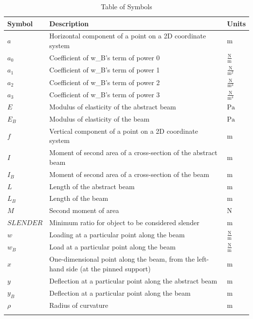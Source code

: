 \documentclass[12pt]{article}
\begin{document}
\begin{longtabu}{l X[l] l}
\toprule
\textbf{Symbol} & \textbf{Description} & \textbf{Units}
\\
\midrule
\endhead
$a$ & Horizontal component of a point on a 2D coordinate system & ${\text{m}}$
\\
${a_{\text{0}}}$ & Coefficient of w\_B's term of power 0 & $\frac{\text{N}}{\text{m}}$
\\
${a_{\text{1}}}$ & Coefficient of w\_B's term of power 1 & $\frac{\text{N}}{\text{m}^{2}}$
\\
${a_{\text{2}}}$ & Coefficient of w\_B's term of power 2 & $\frac{\text{N}}{\text{m}^{3}}$
\\
${a_{\text{3}}}$ & Coefficient of w\_B's term of power 3 & $\frac{\text{N}}{\text{m}^{4}}$
\\
$E$ & Modulus of elasticity of the abstract beam & ${\text{Pa}}$
\\
${E_{B}}$ & Modulus of elasticity of the beam & ${\text{Pa}}$
\\
$f$ & Vertical component of a point on a 2D coordinate system & ${\text{m}}$
\\
$I$ & Moment of second area of a cross-section of the abstract beam & ${\text{m}}$
\\
${I_{B}}$ & Moment of second area of a cross-section of the beam & ${\text{m}}$
\\
$L$ & Length of the abstract beam & ${\text{m}}$
\\
${L_{B}}$ & Length of the beam & ${\text{m}}$
\\
$M$ & Second moment of area & ${\text{N}}$
\\
$\mathit{SLENDER}$ & Minimum ratio for object to be considered slender & ${\text{m}}$
\\
$w$ & Loading at a particular point along the beam & $\frac{\text{N}}{\text{m}}$
\\
${w_{B}}$ & Load at a particular point along the beam & $\frac{\text{N}}{\text{m}}$
\\
$x$ & One-dimensional point along the beam, from the left-hand side (at the pinned support) & ${\text{m}}$
\\
$y$ & Deflection at a particular point along the abstract beam & ${\text{m}}$
\\
${y_{B}}$ & Deflection at a particular point along the beam & ${\text{m}}$
\\
$ρ$ & Radius of curvature & ${\text{m}}$
\\
\bottomrule
\caption{Table of Symbols}
\label{Table:ToS}
\end{longtabu}
\end{document}
